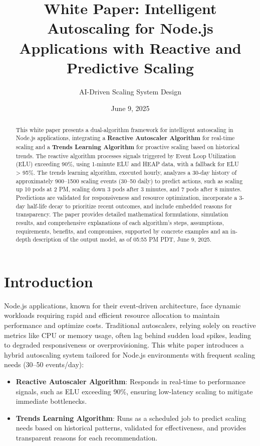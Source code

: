 \documentclass[12pt]{article}
\title{White Paper: Intelligent Autoscaling for Node.js Applications with Reactive and Predictive Scaling}
\author{AI-Driven Scaling System Design}
\date{June 9, 2025}
\begin{document}
\maketitle

\begin{abstract}
This white paper presents a dual-algorithm framework for intelligent autoscaling in Node.js applications, integrating a \textbf{Reactive Autoscaler Algorithm} for real-time scaling and a \textbf{Trends Learning Algorithm} for proactive scaling based on historical trends. The reactive algorithm processes signals triggered by Event Loop Utilization (ELU) exceeding 90\%, using 1-minute ELU and HEAP data, with a fallback for ELU > 95\%. The trends learning algorithm, executed hourly, analyzes a 30-day history of approximately 900–1500 scaling events (30–50 daily) to predict actions, such as scaling up 10 pods at 2 PM, scaling down 3 pods after 3 minutes, and 7 pods after 8 minutes. Predictions are validated for responsiveness and resource optimization, incorporate a 3-day half-life decay to prioritize recent outcomes, and include embedded reasons for transparency. The paper provides detailed mathematical formulations, simulation results, and comprehensive explanations of each algorithm’s steps, assumptions, requirements, benefits, and compromises, supported by concrete examples and an in-depth description of the output model, as of 05:55 PM PDT, June 9, 2025.
\end{abstract}

\section{Introduction}
Node.js applications, known for their event-driven architecture, face dynamic workloads requiring rapid and efficient resource allocation to maintain performance and optimize costs. Traditional autoscalers, relying solely on reactive metrics like CPU or memory usage, often lag behind sudden load spikes, leading to degraded responsiveness or overprovisioning. This white paper introduces a hybrid autoscaling system tailored for Node.js environments with frequent scaling needs (30–50 events/day):

\begin{itemize}
    \item \textbf{Reactive Autoscaler Algorithm}: Responds in real-time to performance signals, such as ELU exceeding 90\%, ensuring low-latency scaling to mitigate immediate bottlenecks.
    \item \textbf{Trends Learning Algorithm}: Runs as a scheduled job to predict scaling needs based on historical patterns, validated for effectiveness, and provides transparent reasons for each recommendation.
\end{itemize}
\end{document}
